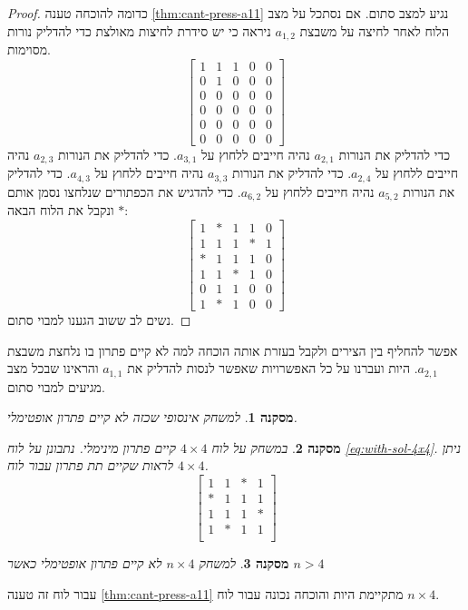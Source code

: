 \documentclass[12pt,leqno]{article}
\theoremstyle{theoremdd}
\newtheorem{corollary}{מסקנה}[section]
\begin{document}
\begin{proof}
    כדומה להוכחה 
    טענה 
    \ref{thm:cant-press-a11}
    נגיע למצב סתום.
    אם נסתכל על מצב הלוח לאחר לחיצה על משבצת 
   $a_{1,2}$ 
   ניראה כי יש סידרת לחיצות מאולצת כדי להדליק נורות מסוימות.
   \[
        \begin{bmatrix}
            1 & 1 & 1 & 0 & 0 \\
            0 & 1 & 0 & 0 & 0 \\
            0 & 0 & 0 & 0 & 0 \\
            0 & 0 & 0 & 0 & 0 \\
            0 & 0 & 0 & 0 & 0 \\
            0 & 0 & 0 & 0 & 0
        \end{bmatrix}
    \]
    כדי להדליק את הנורות 
    $a_{2,1}$
    נהיה חייבים ללחוץ על 
    $a_{3,1}$.
    כדי להדליק את הנורות 
    $a_{2,3}$
    נהיה חייבים ללחוץ על 
    $a_{2,4}$.
    כדי להדליק את הנורות 
    $a_{3,3}$
    נהיה חייבים ללחוץ על 
    $a_{4,3}$.
    כדי להדליק את הנורות 
    $a_{5,2}$
    נהיה חייבים ללחוץ על 
    $a_{6,2}$.
    כדי להדגיש את הכפתורים שנלחצו נסמן
    אותם 
    $*$
    ונקבל את הלוח הבאה:
    \begin{equation}
        \label{eq:with-sol-4x4}
        \begin{bmatrix}
            1 & * & 1 & 1 & 0 \\
            1 & 1 & 1 & * & 1 \\
            * & 1 & 1 & 1 & 0 \\
            1 & 1 & * & 1 & 0 \\
            0 & 1 & 1 & 0 & 0 \\
            1 & * & 1 & 0 & 0
        \end{bmatrix}
    \end{equation}
    נשים לב ששוב הגענו למבוי סתום.
\end{proof}
אפשר להחליף בין הצירים ולקבל בעזרת אותה הוכחה 
למה לא קיים פתרון 
בו נלחצת משבצת 
$a_{2,1}$.
היות ועברנו על כל האפשרויות שאפשר 
לנסות להדליק את 
$a_{1,1}$
והראינו שבכל מצב מגיעים למבוי סתום.
\begin{corollary}
    למשחק אינסופי שכזה לא קיים פתרון אופטימלי.
\end{corollary}
\begin{corollary}
    במשחק על לוח 
    $4 \times 4$
    קיים פתרון מינימלי.
    נתבונן על לוח 
    \ref{eq:with-sol-4x4}.
    ניתן לראות שקיים תת פתרון עבור 
    לוח 
    $4 \times 4$.
    \[
    \begin{bmatrix}
        1 & 1 & * & 1\\
        * & 1 & 1 & 1\\
        1 & 1 & 1 & *\\
        1 & * & 1 & 1\\
    \end{bmatrix}
    \]
\end{corollary}
\begin{corollary}
    למשחק 
    $ n \times 4$
    לא קיים פתרון אופטימלי
    כאשר 
    $n > 4$
\end{corollary}
עבור לוח זה
טענה
\ref{thm:cant-press-a11}
מתקיימת היות והוכחה נכונה עבור לוח 
$ n \times 4$. 
\end{document}
